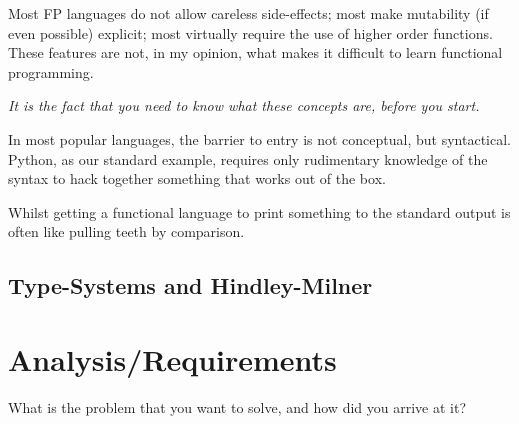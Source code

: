 \documentclass{l4proj}
\begin{document}
Most FP languages do not allow careless side-effects; most make mutability (if even possible) explicit; most virtually require the use of higher order functions. 
These features are not, in my opinion, what makes it difficult to learn functional programming. 

\emph{It is the fact that you need to know what these concepts are, before you start.}

In most popular languages, the barrier to entry is not conceptual, but syntactical.
Python, as our standard example, requires only rudimentary knowledge of the syntax to hack together something that works out of the box.

Whilst getting a functional language to print something to the standard output is often like pulling teeth by comparison.

\section{Type-Systems and Hindley-Milner}


\chapter{Analysis/Requirements}
What is the problem that you want to solve, and how did you arrive at it?
\end{document}
